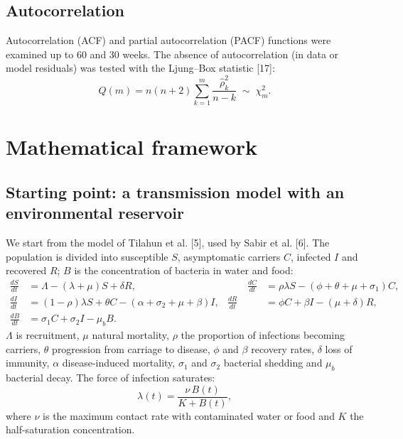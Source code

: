 \documentclass[11pt]{article}
\begin{document}
\subsection{Autocorrelation}
Autocorrelation (ACF) and partial autocorrelation (PACF) functions were examined up to 60 and 30 weeks. The absence of autocorrelation (in data or model residuals) was tested with the Ljung–Box statistic [17]:
\begin{equation}
Q(m)=n(n+2)\sum_{k=1}^{m}\frac{\hat{\rho}_k^{2}}{n-k}\;\sim\;\chi^{2}_{m} .
\label{eq:lb}
\end{equation}

\section{Mathematical framework}
\subsection{Starting point: a transmission model with an environmental reservoir}
We start from the model of Tilahun et al. [5], used by Sabir et al. [6]. The population is divided into susceptible $S$, asymptomatic carriers $C$, infected $I$ and recovered $R$; $B$ is the concentration of bacteria in water and food:
\begin{equation}
\begin{aligned}
\frac{dS}{dt}&=\Lambda-(\lambda+\mu)S+\delta R, &\qquad \frac{dC}{dt}&=\rho\lambda S-(\phi+\theta+\mu+\sigma_1)C,\\
\frac{dI}{dt}&=(1-\rho)\lambda S+\theta C-(\alpha+\sigma_2+\mu+\beta)I, & \frac{dR}{dt}&=\phi C+\beta I-(\mu+\delta)R,\\
\frac{dB}{dt}&=\sigma_1 C+\sigma_2 I-\mu_b B .
\end{aligned}
\label{eq:seir}
\end{equation}
$\Lambda$ is recruitment, $\mu$ natural mortality, $\rho$ the proportion of infections becoming carriers, $\theta$ progression from carriage to disease, $\phi$ and $\beta$ recovery rates, $\delta$ loss of immunity, $\alpha$ disease-induced mortality, $\sigma_1$ and $\sigma_2$ bacterial shedding and $\mu_b$ bacterial decay. The force of infection saturates:
\begin{equation}
\lambda(t)=\frac{\nu\,B(t)}{K+B(t)} ,
\label{eq:lambda}
\end{equation}
where $\nu$ is the maximum contact rate with contaminated water or food and $K$ the half-saturation concentration.
\end{document}
